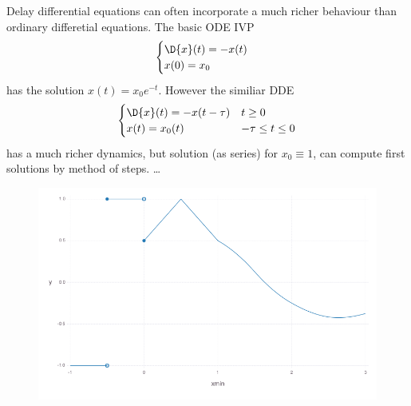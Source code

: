 \begin{example}\label{ex:ode-dde}
    Delay differential equations can often incorporate a much richer behaviour than ordinary differetial equations.
    The basic ODE IVP
    \begin{equation}
        \begin{cases}
            \D{x}(t) = -x(t)\\
            x(0) = x_0
        \end{cases}
    \end{equation}
    has the solution $x(t)=x_0 e^{-t}$. However the similiar DDE
    \begin{equation}
        \begin{cases}
            \D{x}(t) = -x(t-\tau) & t\geq 0\\
            x(t) = x_0(t) & -\tau\leq t\leq 0
        \end{cases}
    \end{equation}
    has a much richer dynamics, but solution (as series) for $x_0\equiv 1$, can compute first solutions by method of steps. \ldots{}    
\end{example}


\begin{figure}[h]\centering
    \includegraphics[width=\textwidth]{figures/piecewise-initial-function.png}
	\label{Piecewise continuous initial function.}
\end{figure}

